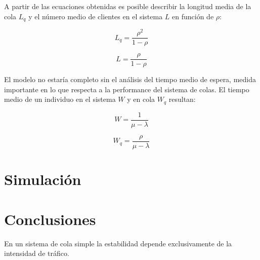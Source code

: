 \documentclass{sig-alternate}
\begin{document}
A partir de las ecuaciones obtenidas es posible describir la longitud media
de la cola $L_{q}$ y el n\'{u}mero medio de clientes en el sistema $L$ en 
funci\'{o}n de $\rho$:

\begin{equation}
\label{longitud_media_en_la_cola}
L_{q} = \frac{\rho^{2}}{1-\rho}
\end{equation}

\begin{equation}
\label{numero_medio_clientes_en_el_sistema}
L = \frac{\rho}{1-\rho}
\end{equation}


El modelo no estar\'{i}a completo sin el an\'{a}lisis del tiempo medio de 
espera, medida importante en lo que respecta a la performance del sistema
de colas. El tiempo medio de un individuo en el sistema $W$ y en cola $W_{q}$
resultan:

\begin{equation}
\label{tiempo_medio_en_el_sistema}
W = \frac{1}{\mu - \lambda}
\end{equation}

\begin{equation}
\label{tiempo_medio_en_la_cola}
W_{q} = \frac{\rho}{\mu - \lambda}
\end{equation}


\section{Simulaci\'{o}n}\label{simulacion}

\section{Conclusiones}\label{conclusiones}

En un sistema de cola simple la estabilidad depende exclusivamente de la
intensidad de tr\'{a}fico.
\end{document}
